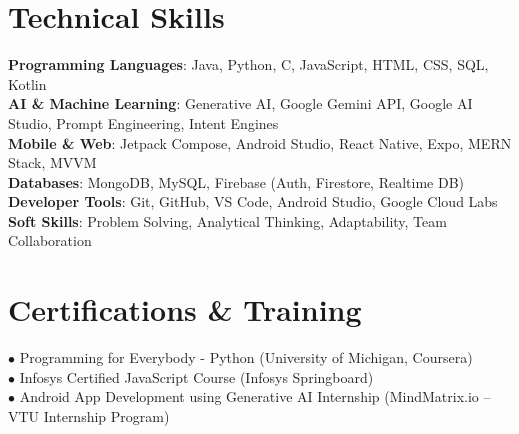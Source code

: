 \documentclass[letterpaper,10.5pt]{article}
\begin{document}
\section{Technical Skills}
 \begin{itemize}[leftmargin=0.15in, label={}]
    \small{\item{
     \textbf{Programming Languages}{: Java, Python, C, JavaScript, HTML, CSS, SQL, Kotlin} \\
     \textbf{AI \& Machine Learning}{: Generative AI, Google Gemini API, Google AI Studio, Prompt Engineering, Intent Engines} \\
     \textbf{Mobile \& Web}{: Jetpack Compose, Android Studio, React Native, Expo, MERN Stack, MVVM} \\
     \textbf{Databases}{: MongoDB, MySQL, Firebase (Auth, Firestore, Realtime DB)} \\
     \textbf{Developer Tools}{: Git, GitHub, VS Code, Android Studio, Google Cloud Labs} \\
     \textbf{Soft Skills}{: Problem Solving, Analytical Thinking, Adaptability, Team Collaboration}
    }}
 \end{itemize}

\section{Certifications \& Training}
 \begin{itemize}[leftmargin=0.15in, label={}]
    \small{\item{
     $\bullet$ Programming for Everybody - Python (University of Michigan, Coursera) \\
     $\bullet$ Infosys Certified JavaScript Course (Infosys Springboard) \\
     $\bullet$ Android App Development using Generative AI Internship (MindMatrix.io -- VTU Internship Program)
    }}
 \end{itemize}
\end{document}
